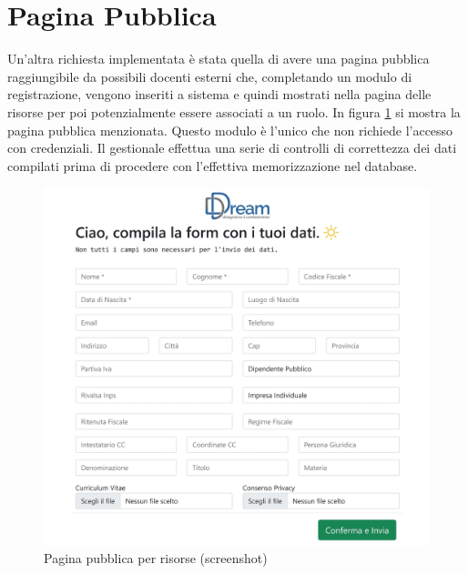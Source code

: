 \section{Pagina Pubblica}
Un'altra richiesta implementata è stata quella di avere una pagina pubblica raggiungibile da possibili docenti esterni che, completando un modulo di registrazione, vengono inseriti a sistema e quindi mostrati nella pagina delle risorse per poi potenzialmente essere associati a un ruolo. In figura \ref{fig:public} si mostra la pagina pubblica menzionata. Questo modulo è l'unico che non richiede l'accesso con credenziali. Il gestionale effettua una serie di controlli di correttezza dei dati compilati prima di procedere con l'effettiva memorizzazione nel database. 
\begin{figure}[!hbt]
\centering
\includegraphics[scale=0.50]{img/screen/Public.jpg}
\caption{Pagina pubblica per risorse (screenshot)}
\label{fig:public}
\end{figure}
\clearpage
\newpage


